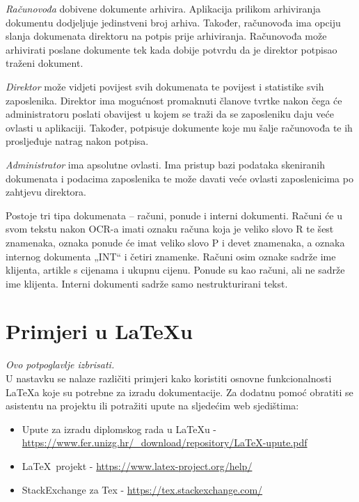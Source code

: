 		\textit{Računovođa} dobivene dokumente arhivira. Aplikacija prilikom arhiviranja	dokumentu dodjeljuje jedinstveni broj arhiva. Također, računovođa ima opciju slanja dokumenata direktoru na potpis prije arhiviranja. Računovođa može arhivirati poslane dokumente tek kada dobije potvrdu da je direktor potpisao traženi dokument.
		
		\textit {Direktor} može vidjeti povijest svih dokumenata te povijest i	statistike svih zaposlenika. Direktor ima mogućnost promaknuti članove tvrtke nakon čega će administratoru poslati obavijest u kojem se traži da se zaposleniku daju veće ovlasti u aplikaciji. Također, potpisuje dokumente koje mu šalje računovođa te ih prosljeđuje natrag nakon potpisa.
		
		\textit{Administrator} ima apsolutne ovlasti. Ima pristup bazi podataka skeniranih dokumenata i podacima zaposlenika te može davati veće ovlasti zaposlenicima po zahtjevu direktora.
		
		Postoje tri tipa dokumenata – računi, ponude i interni dokumenti. Računi će u
		svom tekstu nakon OCR-a imati oznaku računa koja je veliko slovo R te šest znamenaka, oznaka ponude će imat veliko slovo P i devet znamenaka, a oznaka internog dokumenta
		„INT“ i četiri znamenke. Računi osim oznake sadrže ime klijenta, artikle s cijenama i
		ukupnu cijenu. Ponude su kao računi, ali ne sadrže ime klijenta. Interni dokumenti
		sadrže samo nestrukturirani tekst.\\
		
		\eject
		
		\section{Primjeri u \LaTeX u}
		
		\textit{Ovo potpoglavlje izbrisati.}\\

		U nastavku se nalaze različiti primjeri kako koristiti osnovne funkcionalnosti \LaTeX a koje su potrebne za izradu dokumentacije. Za dodatnu pomoć obratiti se asistentu na projektu ili potražiti upute na sljedećim web sjedištima:
		\begin{itemize}
			\item Upute za izradu diplomskog rada u \LaTeX u - \url{https://www.fer.unizg.hr/_download/repository/LaTeX-upute.pdf}
			\item \LaTeX\ projekt - \url{https://www.latex-project.org/help/}
			\item StackExchange za Tex - \url{https://tex.stackexchange.com/}\\
		
		\end{itemize} 	


